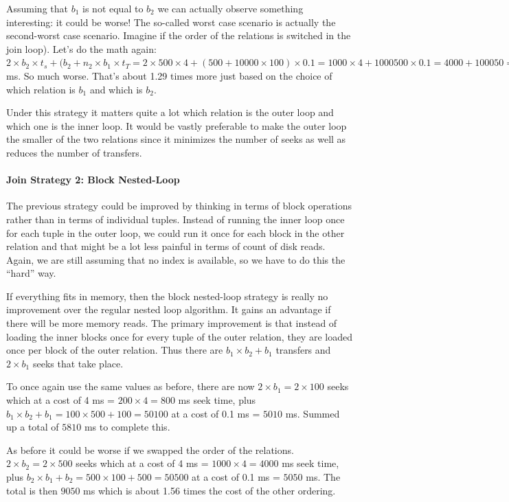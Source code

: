 Assuming that $b_{1}$ is not equal to $b_{2}$ we can actually observe something interesting: it could be worse! The so-called worst case scenario is actually the second-worst case scenario. Imagine if the order of the relations is switched in the join loop). Let's do the math again: $2 \times b_{2} \times t_{s} + (b_{2} + n_{2} \times b_{1} \times t_{T} = 2 \times 500 \times 4 + (500 + 10000 \times 100) \times 0.1 = 1000 \times 4 + 1000500 \times 0.1 = 4000 + 100050 = 104050$ ms. So much worse. That's about 1.29 times more just based on the choice of which relation is $b_{1}$ and which is $b_{2}$.

Under this strategy it matters quite a lot which relation is the outer loop and which one is the inner loop. It would be vastly preferable to make the outer loop the smaller of the two relations since it minimizes the number of seeks as well as reduces the number of transfers. 

\paragraph{Join Strategy 2: Block Nested-Loop}
The previous strategy could be improved by thinking in terms of block operations rather than in terms of individual tuples. Instead of running the inner loop once for each tuple in the outer loop, we could run it once for each block in the other relation and that might be a lot less painful in terms of count of disk reads. Again, we are still assuming that no index is available, so we have to do this the ``hard'' way.

If everything fits in memory, then the block nested-loop strategy is really no improvement over the regular nested loop algorithm. It gains an advantage if there will be more memory reads. The primary improvement is that instead of loading the inner blocks once for every tuple of the outer relation, they are loaded once per block of the outer relation. Thus there are $b_{1} \times b_{2} + b_{1}$ transfers and $2\times b_{1}$ seeks that take place.

To once again use the same values as before, there are now $2 \times b_{1} = 2 \times 100 $ seeks which at a cost of 4 ms = $200 \times 4 = 800$ ms seek time, plus $b_{1} \times b_{2} + b_{1} = 100 \times 500 + 100 = 50100$ at a cost of 0.1 ms = $5010$ ms. Summed up a total of $5810$ ms to complete this.

As before it could be worse if we swapped the order of the relations. $2 \times b_{2} = 2 \times 500 $ seeks which at a cost of 4 ms = $1000 \times 4 = 4000$ ms seek time, plus $b_{2} \times b_{1} + b_{2} = 500 \times 100 + 500 = 50500$ at a cost of 0.1 ms = $5050$ ms. The total is then $9050$ ms which is about 1.56 times the cost of the other ordering. 

